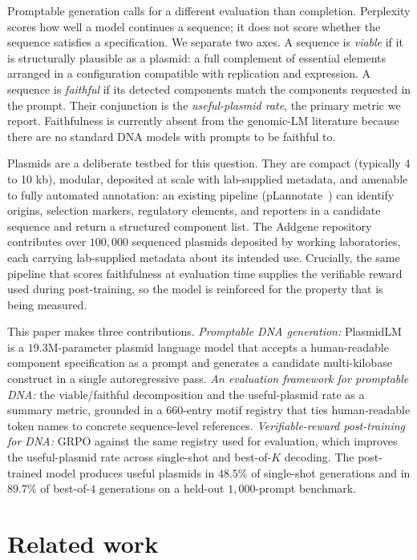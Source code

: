 \documentclass{article}
\begin{document}
Promptable generation calls for a different evaluation than completion. Perplexity
scores how well a model continues a sequence; it does not score whether the sequence
satisfies a specification. We separate two axes. A sequence is \emph{viable} if it is
structurally plausible as a plasmid: a full complement of essential elements arranged in
a configuration compatible with replication and expression. A sequence is
\emph{faithful} if its detected components match the components requested in the prompt.
Their conjunction is the \emph{useful-plasmid rate}, the primary metric we report.
Faithfulness is currently absent from the genomic-LM literature because there are no
standard DNA models with prompts to be faithful to.

Plasmids are a deliberate testbed for this question. They are compact (typically
4 to 10 kb), modular, deposited at scale with lab-supplied metadata, and amenable to
fully automated annotation: an existing pipeline (pLannotate~\citep{mcguffie2021plannotate})
can identify origins, selection markers, regulatory elements, and reporters in a
candidate sequence and return a structured component list. The Addgene repository
contributes over $100{,}000$ sequenced plasmids deposited by working laboratories, each
carrying lab-supplied metadata about its intended use. Crucially, the same pipeline that
scores faithfulness at evaluation time supplies the verifiable reward used during
post-training, so the model is reinforced for the property that is being measured.

This paper makes three contributions. \emph{Promptable DNA generation:} PlasmidLM is a
$19.3$M-parameter plasmid language model that accepts a human-readable component
specification as a prompt and generates a candidate multi-kilobase construct in a single
autoregressive pass. \emph{An evaluation framework for promptable DNA:} the
viable/faithful decomposition and the useful-plasmid rate as a summary metric, grounded
in a $660$-entry motif registry that ties human-readable token names to concrete
sequence-level references. \emph{Verifiable-reward post-training for DNA:} GRPO against
the same registry used for evaluation, which improves the useful-plasmid rate across
single-shot and best-of-$K$ decoding. The post-trained model produces useful plasmids
in $48.5\%$ of single-shot generations and in $89.7\%$ of best-of-$4$ generations on a
held-out $1{,}000$-prompt benchmark.

\section{Related work}
\label{sec:related}
\end{document}
